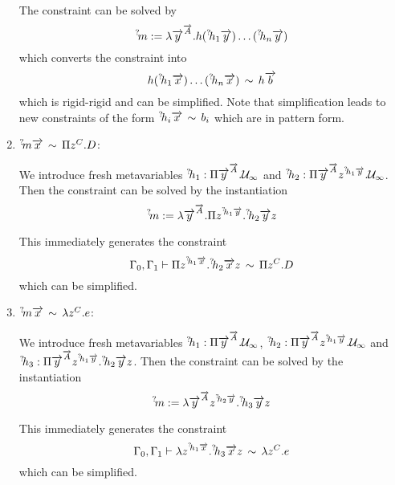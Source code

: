 \begin{enumerate}
        The constraint can be solved by
        $$
            {{}^? \kern-0.2em m} :=
            \lambda {\overrightarrow {y}}^{{\overrightarrow {A}}} .
            h ({{}^? \kern-0.2em h}_1 {\overrightarrow {y}}) \ldots ({{}^? \kern-0.2em h}_n {\overrightarrow {y}})
        $$
        which converts the constraint into
        $$
            h ({{}^? \kern-0.2em h}_1 {\overrightarrow {x}}) \ldots ({{}^? \kern-0.2em h}_n {\overrightarrow {x}})
            \,\sim\,
            h {\overrightarrow {b}}
        $$
        which is rigid-rigid and can be simplified. Note that simplification
        leads to new constraints of the form ${{}^? \kern-0.2em h}_i {\overrightarrow {x}} \,\sim\, b_i$ which
        are in pattern form.

    \item ${{}^? \kern-0.2em m} {\overrightarrow {x}} \,\sim\, \Pi z^C. D$:

        We introduce fresh metavariables
        ${{}^? \kern-0.2em h}_1: \Pi {\overrightarrow {y}}^{{\overrightarrow {A}}}. {{\mathcal U}_\infty}$
        and
        ${{}^? \kern-0.2em h}_2: \Pi {\overrightarrow {y}}^{{\overrightarrow {A}}} z^{{{}^? \kern-0.2em h}_1 {\overrightarrow {y}}} . {{\mathcal U}_\infty}$.
        Then the constraint can be solved by the instantiation
        $$
            {{}^? \kern-0.2em m}
            :=
            \lambda {\overrightarrow {y}}^{{\overrightarrow {A}}}
            . \Pi z^{{{}^? \kern-0.2em h}_1 {\overrightarrow {y}}}. {{}^? \kern-0.2em h}_2 {\overrightarrow {y}} z
        $$

        This immediately generates the constraint
        $$
            \Gamma_0, \Gamma_1
            \vdash
            \Pi z^{{{}^? \kern-0.2em h}_1 {\overrightarrow {x}}} . {{}^? \kern-0.2em h}_2 {\overrightarrow {x}} z
            \,\sim\,
            \Pi z^C . D
        $$
        which can be simplified.

    \item ${{}^? \kern-0.2em m} {\overrightarrow {x}} \,\sim\, \lambda z^C. e$:

        We introduce fresh metavariables
        ${{}^? \kern-0.2em h}_1: \Pi {\overrightarrow {y}}^{{\overrightarrow {A}}}. {{\mathcal U}_\infty}$,
        ${{}^? \kern-0.2em h}_2: \Pi {\overrightarrow {y}}^{{\overrightarrow {A}}} z^{{{}^? \kern-0.2em h}_1 {\overrightarrow {y}}} . {{\mathcal U}_\infty}$
        and
        ${{}^? \kern-0.2em h}_3
        : \Pi {\overrightarrow {y}}^{{\overrightarrow {A}}} z^{{{}^? \kern-0.2em h}_1 {\overrightarrow {y}}}
          . {{}^? \kern-0.2em h}_2 {\overrightarrow {y}} z
        $.
        Then the constraint can be solved by the instantiation
        $$
            {{}^? \kern-0.2em m}
            :=
            \lambda {\overrightarrow {y}}^{{\overrightarrow {A}}} z^{{{}^? \kern-0.2em h}_2 {\overrightarrow {y}}}
            . {{}^? \kern-0.2em h}_3 {\overrightarrow {y}} z
        $$

        This immediately generates the constraint
        $$
            \Gamma_0, \Gamma_1
            \vdash
            \lambda z^{{{}^? \kern-0.2em h}_1 {\overrightarrow {x}}} . {{}^? \kern-0.2em h}_3 {\overrightarrow {x}} z
            \,\sim\,
            \lambda z^C . e
        $$
        which can be simplified.
\end{enumerate}




